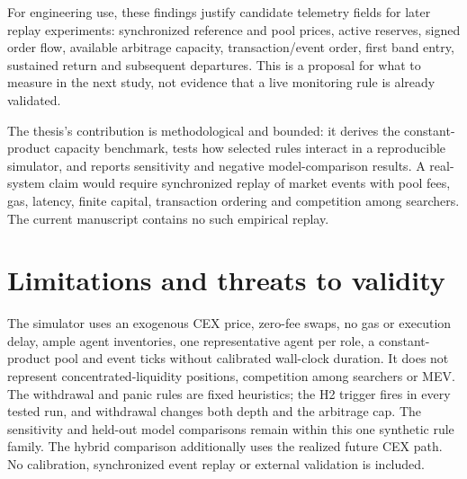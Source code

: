 For engineering use, these findings justify candidate telemetry fields for later replay experiments: synchronized reference and pool prices, active reserves, signed order flow, available arbitrage capacity, transaction/event order, first band entry, sustained return and subsequent departures. This is a proposal for what to measure in the next study, not evidence that a live monitoring rule is already validated.

The thesis's contribution is methodological and bounded: it derives the constant-product capacity benchmark, tests how selected rules interact in a reproducible simulator, and reports sensitivity and negative model-comparison results. A real-system claim would require synchronized replay of market events with pool fees, gas, latency, finite capital, transaction ordering and competition among searchers. The current manuscript contains no such empirical replay.

\section{Limitations and threats to validity}

The simulator uses an exogenous CEX price, zero-fee swaps, no gas or execution delay, ample agent inventories, one representative agent per role, a constant-product pool and event ticks without calibrated wall-clock duration. It does not represent concentrated-liquidity positions, competition among searchers or MEV. The withdrawal and panic rules are fixed heuristics; the H2 trigger fires in every tested run, and withdrawal changes both depth and the arbitrage cap. The sensitivity and held-out model comparisons remain within this one synthetic rule family. The hybrid comparison additionally uses the realized future CEX path. No calibration, synchronized event replay or external validation is included.
